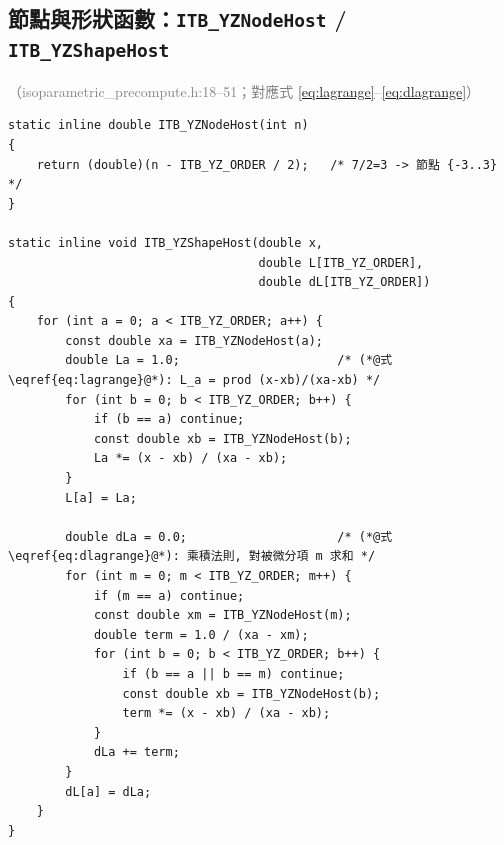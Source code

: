 \documentclass[11pt,a4paper]{article}
\newcommand{\code}[1]{\texttt{#1}}
\newcommand{\filewhere}[1]{\textcolor{gray}{\small（#1）}}
\begin{document}
\subsection{節點與形狀函數：\code{ITB\_YZNodeHost} / \code{ITB\_YZShapeHost}}
\filewhere{isoparametric\_precompute.h:18--51；對應式 \eqref{eq:lagrange}--\eqref{eq:dlagrange}}
\begin{lstlisting}[caption={七點 Lagrange 形狀函數及其導數（封閉式直接求值，非解方程）}]
static inline double ITB_YZNodeHost(int n)
{
    return (double)(n - ITB_YZ_ORDER / 2);   /* 7/2=3 -> 節點 {-3..3} */
}

static inline void ITB_YZShapeHost(double x,
                                   double L[ITB_YZ_ORDER],
                                   double dL[ITB_YZ_ORDER])
{
    for (int a = 0; a < ITB_YZ_ORDER; a++) {
        const double xa = ITB_YZNodeHost(a);
        double La = 1.0;                      /* (*@式\eqref{eq:lagrange}@*): L_a = prod (x-xb)/(xa-xb) */
        for (int b = 0; b < ITB_YZ_ORDER; b++) {
            if (b == a) continue;
            const double xb = ITB_YZNodeHost(b);
            La *= (x - xb) / (xa - xb);
        }
        L[a] = La;

        double dLa = 0.0;                     /* (*@式\eqref{eq:dlagrange}@*): 乘積法則, 對被微分項 m 求和 */
        for (int m = 0; m < ITB_YZ_ORDER; m++) {
            if (m == a) continue;
            const double xm = ITB_YZNodeHost(m);
            double term = 1.0 / (xa - xm);
            for (int b = 0; b < ITB_YZ_ORDER; b++) {
                if (b == a || b == m) continue;
                const double xb = ITB_YZNodeHost(b);
                term *= (x - xb) / (xa - xb);
            }
            dLa += term;
        }
        dL[a] = dLa;
    }
}
\end{lstlisting}
\end{document}

